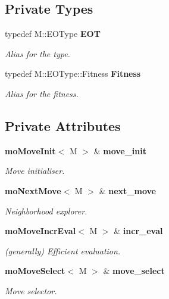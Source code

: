 \subsection*{Private Types}
\begin{CompactItemize}
\item 
typedef M::EOType {\bf EOT}\label{classmo_h_c_move_loop_expl_077befd4106c201eafd3ea22bcea2fe9}

\begin{CompactList}\small\item\em Alias for the type. \item\end{CompactList}\item 
typedef M::EOType::Fitness {\bf Fitness}\label{classmo_h_c_move_loop_expl_f24871224316d5549b9013a2d27ab465}

\begin{CompactList}\small\item\em Alias for the fitness. \item\end{CompactList}\end{CompactItemize}
\subsection*{Private Attributes}
\begin{CompactItemize}
\item 
{\bf mo\-Move\-Init}$<$ M $>$ \& {\bf move\_\-init}\label{classmo_h_c_move_loop_expl_6776fc51331c1b452d026b92448b4ffc}

\begin{CompactList}\small\item\em Move initialiser. \item\end{CompactList}\item 
{\bf mo\-Next\-Move}$<$ M $>$ \& {\bf next\_\-move}\label{classmo_h_c_move_loop_expl_f716c5271e0eba9275c585dc52768443}

\begin{CompactList}\small\item\em Neighborhood explorer. \item\end{CompactList}\item 
{\bf mo\-Move\-Incr\-Eval}$<$ M $>$ \& {\bf incr\_\-eval}\label{classmo_h_c_move_loop_expl_84a8fccba05ab30414281469bc8ee779}

\begin{CompactList}\small\item\em (generally) Efficient evaluation. \item\end{CompactList}\item 
{\bf mo\-Move\-Select}$<$ M $>$ \& {\bf move\_\-select}\label{classmo_h_c_move_loop_expl_13bcd1322b2b97fd665be2f60c532fbb}

\begin{CompactList}\small\item\em Move selector. \item\end{CompactList}\end{CompactItemize}


